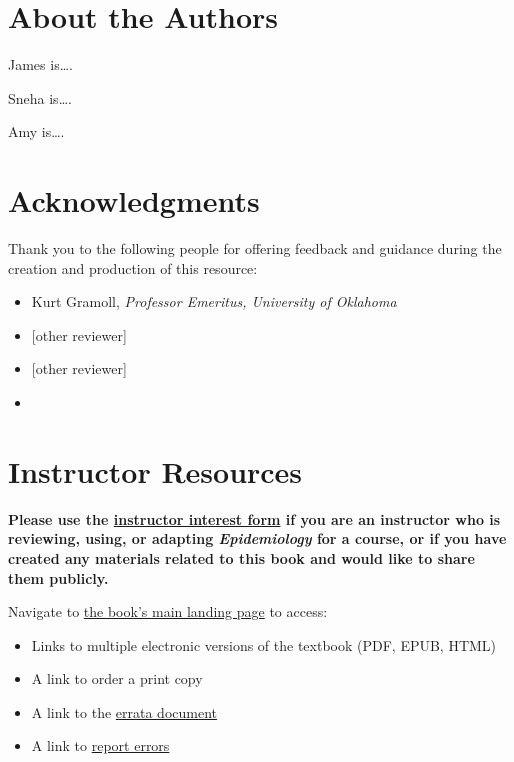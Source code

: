 \documentclass[
  letterpaper,
  DIV=11,
  numbers=noendperiod]{scrreprt}
\begin{document}
\section*{About the Authors}\label{about-the-authors}


James is\ldots.

Sneha is\ldots.

Amy is\ldots.

\section*{Acknowledgments}\label{acknowledgments}


Thank you to the following people for offering feedback and guidance
during the creation and production of this resource:

\begin{itemize}
\item
  Kurt Gramoll, \emph{Professor Emeritus, University of Oklahoma}
\item
  {[}other reviewer{]}
\item
  {[}other reviewer{]}
\item
\end{itemize}

\section*{Instructor Resources}\label{instructor-resources}


\textbf{Please use the
\href{https://bit.ly/teachagriculture_interest}{instructor interest
form} if you are an instructor who is reviewing, using, or adapting
\emph{Epidemiology} for a course, or if you have created any materials
related to this book and would like to share them publicly.}

Navigate to \href{https://doi.org/10.21061/teachagriculture}{the book's
main landing page} to access:

\begin{itemize}
\item
  Links to multiple electronic versions of the textbook (PDF, EPUB,
  HTML)
\item
  A link to order a print copy
\item
  A link to the \href{https://bit.ly/teachagriculture_errata}{errata
  document}
\item
  A link to \href{https://bit.ly/teachagriculture_errors}{report errors}
\end{itemize}
\end{document}
